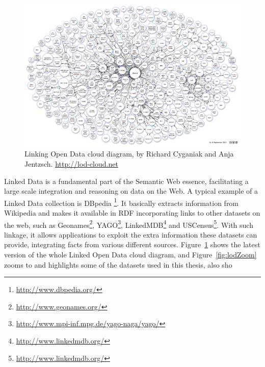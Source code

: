 \begin{figure}[h!]
\label{fig:lod}
\begin{center}
  \includegraphics[width=1\linewidth]{./Figures/lod-datasets_2011-09-19.png}
\end{center}
\caption{Linking Open Data cloud diagram, by Richard Cyganiak and Anja Jentzsch. \url{http://lod-cloud.net}}
\end{figure}

Linked Data is a fundamental part of the Semantic Web essence, facilitating a large scale integration and reasoning
on data on the Web. A typical example of a Linked Data collection is DBpedia
{\footnote{\url{http://www.dbpedia.org/}}}. It basically extracts information from Wikipedia and
makes it available in RDF incorporating links to other datasets on the web, such as 
Geonames\footnote{\url{http://www.geonames.org/}},
YAGO\footnote{\url{http://www.mpi-inf.mpg.de/yago-naga/yago/}}, 
LinkedMDB\footnote{\url{http://www.linkedmdb.org/}} and 
USCensus\footnote{\url{http://www.linkedmdb.org/}}. 
With such linkage, it allows
applications to exploit the extra information these datasets can provide, integrating facts from various different
sources. Figure~\ref{fig:lod} shows the latest version of the whole Linked Open Data cloud
diagram, and Figure~\ref{fig:lodZoom} zooms to and highlights some of the datasets used in this thesis, also sho

